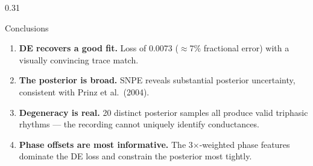 \documentclass[final]{beamer}
\begin{document}
\begin{frame}[t]{}
\begin{columns}[t]
\begin{column}{0.31\paperwidth}
  \begin{alertblock}{Conclusions}
    \begin{enumerate}
      \item \textbf{DE recovers a good fit.}
            Loss of 0.0073 ($\approx$7\% fractional error) with a
            visually convincing trace match.
      \item \textbf{The posterior is broad.}
            SNPE reveals substantial posterior uncertainty, consistent
            with Prinz et al.\ (2004).
      \item \textbf{Degeneracy is real.}
            20 distinct posterior samples all produce valid triphasic
            rhythms — the recording cannot uniquely identify conductances.
      \item \textbf{Phase offsets are most informative.}
            The 3$\times$-weighted phase features dominate the DE loss
            and constrain the posterior most tightly.
    \end{enumerate}
  \end{alertblock}

\end{column}
\end{columns}

\end{frame}
\end{document}
